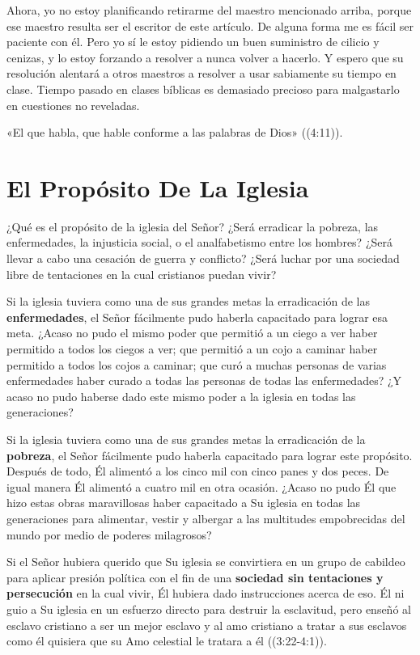 \documentclass[12pt, twoside, openright]{book}
\begin{document}
Ahora, yo no estoy planificando retirarme del maestro mencionado arriba, porque ese maestro resulta ser el escritor de este artículo. De alguna forma me es fácil ser paciente con él. Pero yo sí le estoy pidiendo un buen suministro de cilicio y cenizas, y lo estoy forzando a resolver a nunca volver a hacerlo. Y espero que su resolución alentará a otros maestros a resolver a usar sabiamente su tiempo en clase. Tiempo pasado en clases bíblicas es demasiado precioso para malgastarlo en cuestiones no reveladas.

«El que habla, que hable conforme a las palabras de Dios» ((4:11)).

\section{El Propósito De La Iglesia}
¿Qué es el propósito de la iglesia del Señor? ¿Será erradicar la pobreza, las enfermedades, la injusticia social, o el analfabetismo entre los hombres? ¿Será llevar a cabo una cesación de guerra y conflicto? ¿Será luchar por una sociedad libre de tentaciones en la cual cristianos puedan vivir? 

Si la iglesia tuviera como una de sus grandes metas la erradicación de las \textbf{enfermedades}, el Señor fácilmente pudo haberla capacitado para lograr esa meta. ¿Acaso no pudo el mismo poder que permitió a un ciego a ver haber permitido a todos los ciegos a ver; que permitió a un cojo a caminar haber permitido a todos los cojos a caminar; que curó a muchas personas de varias enfermedades haber curado a todas las personas de todas las enfermedades? ¿Y acaso no pudo haberse dado este mismo poder a la iglesia en todas las generaciones?

Si la iglesia tuviera como una de sus grandes metas la erradicación de la \textbf{pobreza}, el Señor fácilmente pudo haberla capacitado para lograr este propósito. Después de todo, Él alimentó a los cinco mil con cinco panes y dos peces. De igual manera Él alimentó a cuatro mil en otra ocasión. ¿Acaso no pudo Él que hizo estas obras maravillosas haber capacitado a Su iglesia en todas las generaciones para alimentar, vestir y albergar a las multitudes empobrecidas del mundo por medio de poderes milagrosos?

Si el Señor hubiera querido que Su iglesia se convirtiera en un grupo de cabildeo para aplicar presión política con el fin de una \textbf{sociedad sin tentaciones y persecución} en la cual vivir, Él hubiera dado instrucciones acerca de eso. Él ni guio a Su iglesia en un esfuerzo directo para destruir la esclavitud, pero enseñó al esclavo cristiano a ser un mejor esclavo y al amo cristiano a tratar a sus esclavos como él quisiera que su Amo celestial le tratara a él ((3:22-4:1)).
\end{document}
